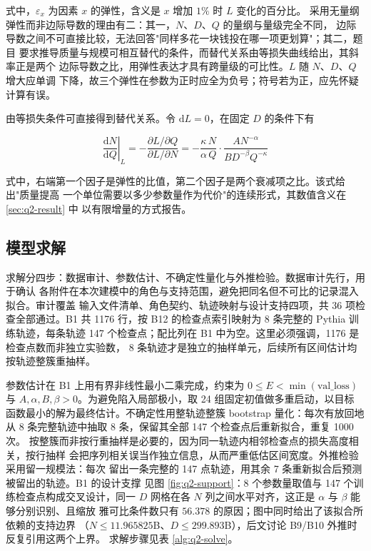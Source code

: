 \documentclass[bwprint]{gmcmthesis}
\numberwithin{equation}{section}
\numberwithin{figure}{section}
\numberwithin{table}{section}
\begin{document}
式中，$\varepsilon_x$ 为因素 $x$ 的弹性，含义是 $x$ 增加 $1\%$ 时 $L$ 变化的百分比。
采用无量纲弹性而非边际导数的理由有二：其一，$N$、$D$、$Q$ 的量纲与量级完全不同，
边际导数之间不可直接比较，无法回答"同样多花一块钱投在哪一项更划算"；其二，题目
要求推导质量与规模可相互替代的条件，而替代关系由等损失曲线给出，其斜率正是两个
边际导数之比，用弹性表达才具有跨量级的可比性。$L$ 随 $N$、$D$、$Q$ 增大应单调
下降，故三个弹性在参数为正时应全为负号；符号若为正，应先怀疑计算有误。

由等损失条件可直接得到替代关系。令 $\mathrm{d}L=0$，在固定 $D$ 的条件下有

\begin{equation}
\left.\frac{\mathrm{d}N}{\mathrm{d}Q}\right|_{L}
=-\frac{\partial L/\partial Q}{\partial L/\partial N}
=-\frac{\kappa\,N}{\alpha\,Q}\cdot\frac{AN^{-\alpha}}{BD^{-\beta}Q^{-\kappa}}
\end{equation}

式中，右端第一个因子是弹性的比值，第二个因子是两个衰减项之比。该式给出"质量提高
一个单位需要以多少参数量作为代价"的连续形式，其数值含义在 \ref{sec:q2-result} 中
以有限增量的方式报告。

\subsection{模型求解}

求解分四步：数据审计、参数估计、不确定性量化与外推检验。数据审计先行，用于确认
各附件在本次建模中的角色与支持范围，避免把同名但不可比的记录混入拟合。审计覆盖
输入文件清单、角色契约、轨迹映射与设计支持四项，共 36 项检查全部通过。B1 共
1176 行，按 B12 的检查点索引映射为 8 条完整的 Pythia 训练轨迹，每条轨迹
147 个检查点；配比列在 B1 中为空。这里必须强调，1176 是检查点数而非独立实验数，
8 条轨迹才是独立的抽样单元，后续所有区间估计均按轨迹整簇重抽样。

参数估计在 B1 上用有界非线性最小二乘完成，约束为 $0\le E<\min(\mathrm{val\_loss})$
与 $A,\alpha,B,\beta>0$。为避免陷入局部极小，取 24 组固定初值做多重启动，以目标
函数最小的解为最终估计。不确定性用整轨迹整簇 bootstrap 量化：每次有放回地
从 8 条完整轨迹中抽取 8 条，保留其全部 147 个检查点后重新拟合，重复 1000 次。
按整簇而非按行重抽样是必要的，因为同一轨迹内相邻检查点的损失高度相关，按行抽样
会把序列相关误当作独立信息，从而严重低估区间宽度。外推检验采用留一规模法：每次
留出一条完整的 147 点轨迹，用其余 7 条重新拟合后预测被留出的轨迹。B1 的设计支撑
见图 \ref{fig:q2-support}：8 个参数量取值与 147 个训练检查点构成交叉设计，同一
$D$ 网格在各 $N$ 列之间水平对齐，这正是 $\alpha$ 与 $\beta$ 能够分别识别、且缩放
雅可比条件数只有 $56.378$ 的原因；图中同时给出了该拟合所依赖的支持边界
（$N\le11.965825$B、$D\le299.893$B），后文讨论 B9/B10 外推时反复引用这两个上界。
求解步骤见表 \ref{alg:q2-solve}。
\end{document}
